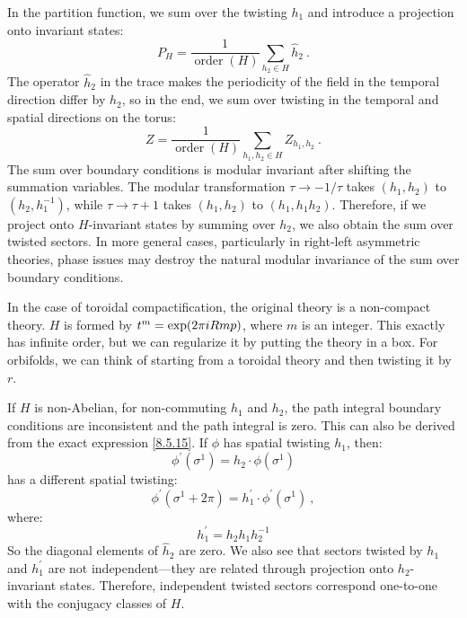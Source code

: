 In the partition function, we sum over the twisting $h_{1}$ and introduce a projection onto invariant states:
\begin{equation}
	P_{H}=\frac{1}{\operatorname{order}(H)} \sum_{h_{2} \in H} \hat{h}_{2} \:. \label{8.5.15}
\end{equation}
The operator $\hat{h}_{2}$ in the trace makes the periodicity of the field in the temporal direction differ by $h_{2}$, so in the end, we sum over twisting in the temporal and spatial directions on the torus:
\begin{equation}
	Z=\frac{1}{\operatorname{order}(H)} \sum_{h_{1}, h_{2} \in H} Z_{h_{1}, h_{2}} \:. \label{8.5.16}
\end{equation}
The sum over boundary conditions is modular invariant after shifting the summation variables. 
The modular transformation $\tau \rightarrow-1 / \tau$ takes $(h_{1}, h_{2})$ to $(h_{2}, h_{1}^{-1})$, 
while $\tau \rightarrow \tau+1$ takes $(h_{1}, h_{2})$ to $(h_{1}, h_{1} h_{2})$. 
Therefore, if we project onto $H$-invariant states by summing over $h_{2}$, we also obtain the sum over twisted sectors. In more general cases, particularly in right-left asymmetric theories, phase issues may destroy the natural modular invariance of the sum over boundary conditions.

In the case of toroidal compactification, the original theory is a non-compact theory. $H$ is formed by $t^{m}=\exp (2 \pi i R m p)$, where $m$ is an integer. 
This exactly has infinite order, but we can regularize it by putting the theory in a box. For orbifolds, we can think of starting from a toroidal theory and then twisting it by $r$.

If $H$ is non-Abelian, for non-commuting $h_{1}$ and $h_{2}$, the path integral boundary conditions are inconsistent and the path integral is zero. This can also be derived from the exact expression \eqref{8.5.15}. 
If $\phi$ has spatial twisting $h_{1}$, then:
\begin{equation}
	\phi^{\prime}(\sigma^{1})=h_{2} \cdot \phi(\sigma^{1}) \label{8.5.17}
\end{equation}
has a different spatial twisting:
\begin{equation}
	\phi^{\prime}(\sigma^{1}+2 \pi)=h_{1}^{\prime} \cdot \phi^{\prime}(\sigma^{1}) \:, \label{8.5.18}
\end{equation}
where:
\begin{equation}
	h_{1}^{\prime}=h_{2} h_{1} h_{2}^{-1} \label{8.5.19}
\end{equation}
So the diagonal elements of $\hat{h}_{2}$ are zero. 
We also see that sectors twisted by $h_{1}$ and $h_{1}^{\prime}$ are not independent—they are related through projection onto $h_{2}$-invariant states. Therefore, independent twisted sectors correspond one-to-one with the conjugacy classes of $H$.

